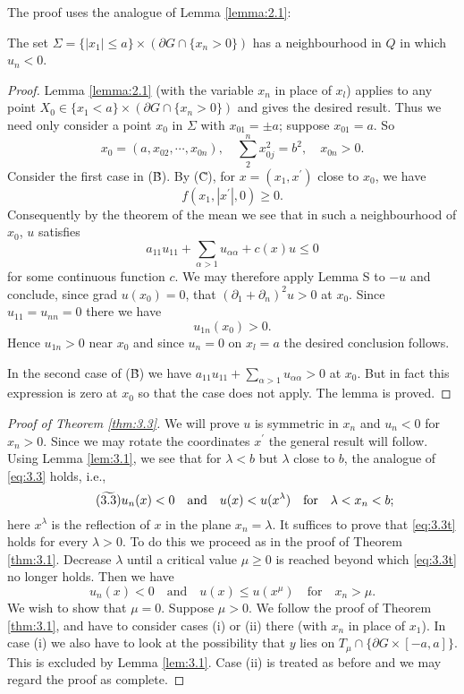 The proof uses the analogue of Lemma \ref{lemma:2.1}:
\begin{lemma}\label{lem:3.2}
  The set $\Sigma=\{|x_1|\leq a\}\times(\partial G\cap\{x_n>0\})$ has a neighbourhood in $Q$ in which $u_n <0$.
\end{lemma}
\begin{proof}
  Lemma \ref{lemma:2.1} (with the variable $x_n$ in place of $x_l$) 
  applies to any point $X_0\in\{x_1<a\} \times (\partial G\cap\{x_n>0\})$ 
  and gives the desired result. Thus we need only consider a point $x_0$ 
  in $\Sigma$ with $x_{01} = \pm a$; suppose $x_{01} = a$. So
  \[ x_0=(a,x_{02},\cdots,x_{0n}),\quad \sum_{2}^{n}x_{0j}^2 = b^2,\quad x_{0n}>0. \]
  Consider the first case in (\~B). By (\~C),
  for $x=(x_1,x^{\prime})$ close to $x_0$, we have
  \[ f(x_1,|x^{\prime}|,0)\geq 0. \]
  Consequently by the theorem of the mean we see that in such a neighbourhood of $x_0$, 
  $u$ satisfies
  \[ a_{11}u_{11}+\sum_{\alpha>1} u_{\alpha\alpha} + c(x)u \leq 0 \]
  for some continuous function $c$. We may therefore apply Lemma S to $-u$ and conclude, since grad $u(x_0)= 0$, that $(\partial_1 + \partial_n)^2 u > 0$ at $x_0$. Since $u_{11} = u_{nn} = 0$ there we have
  \[u_{1n}(x_0)>0.\]
  Hence $u_{1n} > 0$ near $x_0$ and since $u_n =0$ on $x_l = a$ the desired conclusion follows.
  
  In the second case of (\~B) we have $a_{11}u_{11} + \sum_{\alpha>1} u_{\alpha\alpha}>0$ at $x_0$. But in fact this expression is zero at $x_0$ so that the case does not apply. The lemma is proved.
\end{proof}

\begin{proof}[Proof of Theorem \ref{thm:3.3}]
  We will prove $u$ is symmetric in $x_n$ and $u_n < 0$ for $x_n > 0$. 
  Since we may rotate the coordinates $x^{\prime}$ the general result will follow. 
  Using Lemma \ref{lem:3.1}, we see that for $\lambda<b$ but $\lambda$ close to $b$,
  the analogue of \eqref{eq:3.3} holds, i.e.,
  \begin{equation}\tag{$\widetilde{3.3}$}\label{eq:3.3t}
    u_n(x)<0\quad \text{and} \quad u(x)<u(x^{\lambda}) \quad\text{for}\quad \lambda<x_n<b; 
  \end{equation}
  here $x^{\lambda}$ is the reflection of $x$ in the plane $x_n = \lambda$. It suffices to prove that \eqref{eq:3.3t} holds for every $\lambda>0$. To do this we proceed as in the proof of Theorem \ref{thm:3.1}. Decrease $\lambda$ until a critical value $\mu\geq  0$ is reached beyond which \eqref{eq:3.3t} no longer holds. Then we have
  \begin{equation}
    u_n(x)<0\quad\text{and}\quad u(x)\leq  u(x^{\mu}) \quad\text{for}\quad x_n>\mu.
  \end{equation}
  We wish to show that $\mu=0$. Suppose $\mu>0$. We follow the proof of Theorem \ref{thm:3.1}, and have to consider cases (i) or (ii) there (with $x_n$ in place of $x_1$). In case (i) we also have to look at the possibility that $y$ lies on $T_{\mu}\cap \{\partial G \times [-a,a] \}$. This is excluded by Lemma \ref{lem:3.1}. Case (ii) is treated as before and we may regard the proof as complete.
\end{proof}

